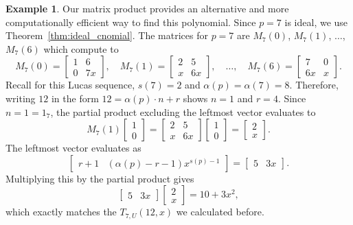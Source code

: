 \documentclass{amsart}
\theoremstyle{definition}
\newtheorem*{example*}{Example}
\begin{document}
\begin{example*}
Our matrix product provides an alternative and more computationally efficient way to find this polynomial. Since $p = 7$ is ideal, we use Theorem~\ref{thm:ideal_cnomial}. The matrices for $p=7$ are $M_7(0)$, $M_7(1)$, $\dots$, $M_7(6)$ which compute to 
$$M_7(0)=\begin{bmatrix}1&6\\0&7x\end{bmatrix}, \quad
M_7(1)=\begin{bmatrix}2&5\\x&6x\end{bmatrix},\quad \dots , \quad 
M_7(6)=\begin{bmatrix}7&0\\6x&x\end{bmatrix}.
$$ 
Recall for this Lucas sequence, $s(7)=2$ and $\alpha(p)=\alpha(7)=8$. Therefore, writing 
$12$ in the form $12=\alpha(p)\cdot n+r$ shows $n=1$ and $r=4$. 
Since $n=1=1_7$, the partial product excluding the leftmost vector evaluates to $$M_7(1)\begin{bmatrix}1\\0\end{bmatrix}=\begin{bmatrix}2&5\\x&6x\end{bmatrix}\begin{bmatrix}1\\0\end{bmatrix}=\begin{bmatrix}2\\x\end{bmatrix}.$$ 
The leftmost vector evaluates as $$\begin{bmatrix}
    r+1&(\alpha(p) - r - 1)x^{s(p) - 1}
\end{bmatrix}=\begin{bmatrix}
    5&3x
\end{bmatrix}.$$
Multiplying this by the partial product gives $$\begin{bmatrix}
    5&3x
\end{bmatrix}\begin{bmatrix}2\\x\end{bmatrix}=10+3x^2,$$ which exactly matches the $T_{7,U}(12,x)$ we calculated before. 
\end{example*}
\end{document}
